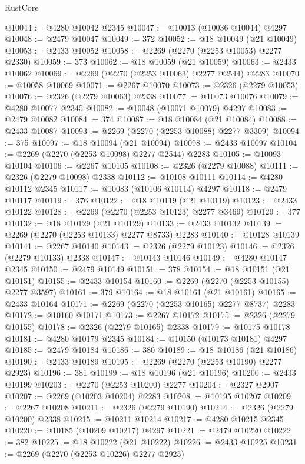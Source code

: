 \begin{lexlean}{RustCore}
\begin{coremodule}
@10044 := @4280 @10042 @2345
@10047 := @10013 (@10036 @10044) @4297
@10048 := @2479 @10047
@10049 := 372
@10052 := @18 @10049 (@21 @10049)
@10053 := @2433 @10052
@10058 := @2269 (@2270 (@2253 @10053) @2277 @2330)
@10059 := 373
@10062 := @18 @10059 (@21 @10059)
@10063 := @2433 @10062
@10069 := @2269 (@2270 (@2253 @10063) @2277 @2544) @2283
@10070 := @10058 @10069
@10071 := @2267 @10070
@10073 := @2326 (@2279 @10053)
@10076 := @2326 (@2279 @10063) @2338
@10077 := @10073 @10076
@10079 := @4280 @10077 @2345
@10082 := @10048 (@10071 @10079) @4297
@10083 := @2479 @10082
@10084 := 374
@10087 := @18 @10084 (@21 @10084)
@10088 := @2433 @10087
@10093 := @2269 (@2270 (@2253 @10088) @2277 @3309)
@10094 := 375
@10097 := @18 @10094 (@21 @10094)
@10098 := @2433 @10097
@10104 := @2269 (@2270 (@2253 @10098) @2277 @2544) @2283
@10105 := @10093 @10104
@10106 := @2267 @10105
@10108 := @2326 (@2279 @10088)
@10111 := @2326 (@2279 @10098) @2338
@10112 := @10108 @10111
@10114 := @4280 @10112 @2345
@10117 := @10083 (@10106 @10114) @4297
@10118 := @2479 @10117
@10119 := 376
@10122 := @18 @10119 (@21 @10119)
@10123 := @2433 @10122
@10128 := @2269 (@2270 (@2253 @10123) @2277 @3469)
@10129 := 377
@10132 := @18 @10129 (@21 @10129)
@10133 := @2433 @10132
@10139 := @2269 (@2270 (@2253 @10133) @2277 @8733) @2283
@10140 := @10128 @10139
@10141 := @2267 @10140
@10143 := @2326 (@2279 @10123)
@10146 := @2326 (@2279 @10133) @2338
@10147 := @10143 @10146
@10149 := @4280 @10147 @2345
@10150 := @2479 @10149
@10151 := 378
@10154 := @18 @10151 (@21 @10151)
@10155 := @2433 @10154
@10160 := @2269 (@2270 (@2253 @10155) @2277 @3597)
@10161 := 379
@10164 := @18 @10161 (@21 @10161)
@10165 := @2433 @10164
@10171 := @2269 (@2270 (@2253 @10165) @2277 @8737) @2283
@10172 := @10160 @10171
@10173 := @2267 @10172
@10175 := @2326 (@2279 @10155)
@10178 := @2326 (@2279 @10165) @2338
@10179 := @10175 @10178
@10181 := @4280 @10179 @2345
@10184 := @10150 (@10173 @10181) @4297
@10185 := @2479 @10184
@10186 := 380
@10189 := @18 @10186 (@21 @10186)
@10190 := @2433 @10189
@10195 := @2269 (@2270 (@2253 @10190) @2277 @2923)
@10196 := 381
@10199 := @18 @10196 (@21 @10196)
@10200 := @2433 @10199
@10203 := @2270 (@2253 @10200) @2277
@10204 := @2327 @2907
@10207 := @2269 (@10203 @10204) @2283
@10208 := @10195 @10207
@10209 := @2267 @10208
@10211 := @2326 (@2279 @10190)
@10214 := @2326 (@2279 @10200) @2338
@10215 := @10211 @10214
@10217 := @4280 @10215 @2345
@10220 := @10185 (@10209 @10217) @4297
@10221 := @2479 @10220
@10222 := 382
@10225 := @18 @10222 (@21 @10222)
@10226 := @2433 @10225
@10231 := @2269 (@2270 (@2253 @10226) @2277 @2925)

\end{coremodule}
\end{lexlean}
